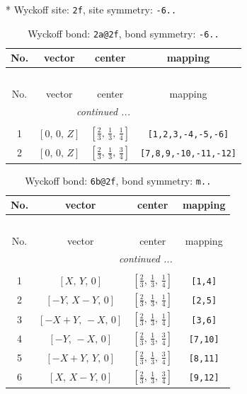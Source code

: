 \documentclass[fleqn,8pt]{jsarticle}
\begin{document}
* Wyckoff site: {\tt 2f}, site symmetry: {\tt -6..}
\renewcommand{\arraystretch}{1.2}
\begin{longtable}{cccc}
\caption{Wyckoff bond: {\tt 2a@2f}, bond symmetry: {\tt -6..}}
 \\
 \hline \hline
No. & vector & center & mapping \\ \hline \endfirsthead

\multicolumn{3}{l}{\tablename\ \thetable{}} \\
 \hline \hline
No. & vector & center & mapping \\ \hline \endhead

 \hline \hline
\multicolumn{3}{r}{\footnotesize\it continued ...} \\ \endfoot

 \hline \hline
\multicolumn{3}{r}{} \\ \endlastfoot

1 & $\left[ 0,\, 0,\, Z \right]$ & $\left[ \frac{2}{3},\, \frac{1}{3},\, \frac{1}{4} \right]$ & {\tt [1,2,3,-4,-5,-6]} \\ \hline
2 & $\left[ 0,\, 0,\, Z \right]$ & $\left[ \frac{2}{3},\, \frac{1}{3},\, \frac{3}{4} \right]$ & {\tt [7,8,9,-10,-11,-12]} \\
\end{longtable}
\renewcommand{\arraystretch}{1.2}
\begin{longtable}{cccc}
\caption{Wyckoff bond: {\tt 6b@2f}, bond symmetry: {\tt m..}}
 \\
 \hline \hline
No. & vector & center & mapping \\ \hline \endfirsthead

\multicolumn{3}{l}{\tablename\ \thetable{}} \\
 \hline \hline
No. & vector & center & mapping \\ \hline \endhead

 \hline \hline
\multicolumn{3}{r}{\footnotesize\it continued ...} \\ \endfoot

 \hline \hline
\multicolumn{3}{r}{} \\ \endlastfoot

1 & $\left[ X,\, Y,\, 0 \right]$ & $\left[ \frac{2}{3},\, \frac{1}{3},\, \frac{1}{4} \right]$ & {\tt [1,4]} \\ \hline
2 & $\left[ - Y,\, X - Y,\, 0 \right]$ & $\left[ \frac{2}{3},\, \frac{1}{3},\, \frac{1}{4} \right]$ & {\tt [2,5]} \\ \hline
3 & $\left[ - X + Y,\, - X,\, 0 \right]$ & $\left[ \frac{2}{3},\, \frac{1}{3},\, \frac{1}{4} \right]$ & {\tt [3,6]} \\ \hline
4 & $\left[ - Y,\, - X,\, 0 \right]$ & $\left[ \frac{2}{3},\, \frac{1}{3},\, \frac{3}{4} \right]$ & {\tt [7,10]} \\ \hline
5 & $\left[ - X + Y,\, Y,\, 0 \right]$ & $\left[ \frac{2}{3},\, \frac{1}{3},\, \frac{3}{4} \right]$ & {\tt [8,11]} \\ \hline
6 & $\left[ X,\, X - Y,\, 0 \right]$ & $\left[ \frac{2}{3},\, \frac{1}{3},\, \frac{3}{4} \right]$ & {\tt [9,12]} \\
\end{longtable}
\end{document}
